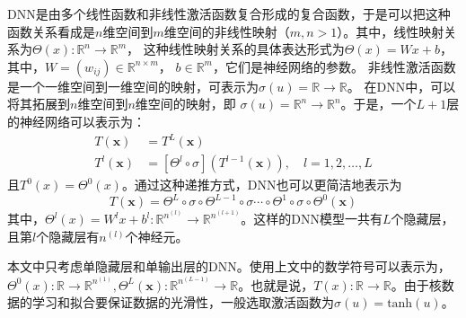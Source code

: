 DNN是由多个线性函数和非线性激活函数复合形成的复合函数，于是可以把这种函数关系看成是$n$维空间到$m$维空间的非线性映射（$m,n>1$）。其中，线性映射关系为$\Theta(x):\mathbb{R}^n\rightarrow \mathbb{R}^{m}$，
这种线性映射关系的具体表达形式为$\Theta(x) = Wx + b$，
其中，$W = (w_{ij})\in \mathbb{R}^{n\times m}$，
$b\in \mathbb{R}^m$，它们是神经网络的参数。
非线性激活函数是一个一维空间到一维空间的映射，可表示为$\sigma (u) = \mathbb{R}\rightarrow \mathbb{R}$。
在DNN中，可以将其拓展到$n$维空间到$n$维空间的映射，即
$\sigma (u) = \mathbb{R}^{n}\rightarrow \mathbb{R}^{n}$。于是，一个$L+1$层的神经网络可以表示为：
\begin{equation}
    \begin{aligned}
T(\boldsymbol{x}) & =T^{L}(\boldsymbol{x}) \\
T^{l}(\boldsymbol{x}) & =\left[\Theta^{l} \circ \sigma\right]\left(T^{l-1}(\boldsymbol{x})\right), \quad l=1,2, \ldots ,L
\end{aligned}
\end{equation}
且$T^{0}(x) = \Theta^{0}(x)$。通过这种递推方式，DNN也可以更简洁地表示为
\begin{equation}
    T(\boldsymbol{x})=\Theta^{L} \circ \sigma \circ \Theta^{L-1} \circ \sigma \cdots \circ \Theta^{1} \circ \sigma \circ \Theta^{0}(\boldsymbol{x})
\end{equation}
其中，$\Theta ^{l}(x)=W^{l}x+b^{l}:\mathbb{R}^{n^{(l)}}\rightarrow \mathbb{R}^{n^{(l+1)}}$。这样的DNN模型一共有$L$个隐藏层，且第$l$个隐藏层有$n^{(l)}$个神经元。

本文中只考虑单隐藏层和单输出层的DNN。使用上文中的数学符号可以表示为，$\Theta^{0}(x): \mathbb{R} \rightarrow \mathbb{R}^{n^{(1)}}, \Theta^{L}(\boldsymbol{x}):\mathbb{R}^{n^{(L-1)}}\rightarrow \mathbb{R}$。也就是说，$T(x):\mathbb{R}\rightarrow \mathbb{R}$。由于核数据的学习和拟合要保证数据的光滑性，一般选取激活函数为$\sigma (u)=\text{tanh}(u)$。

